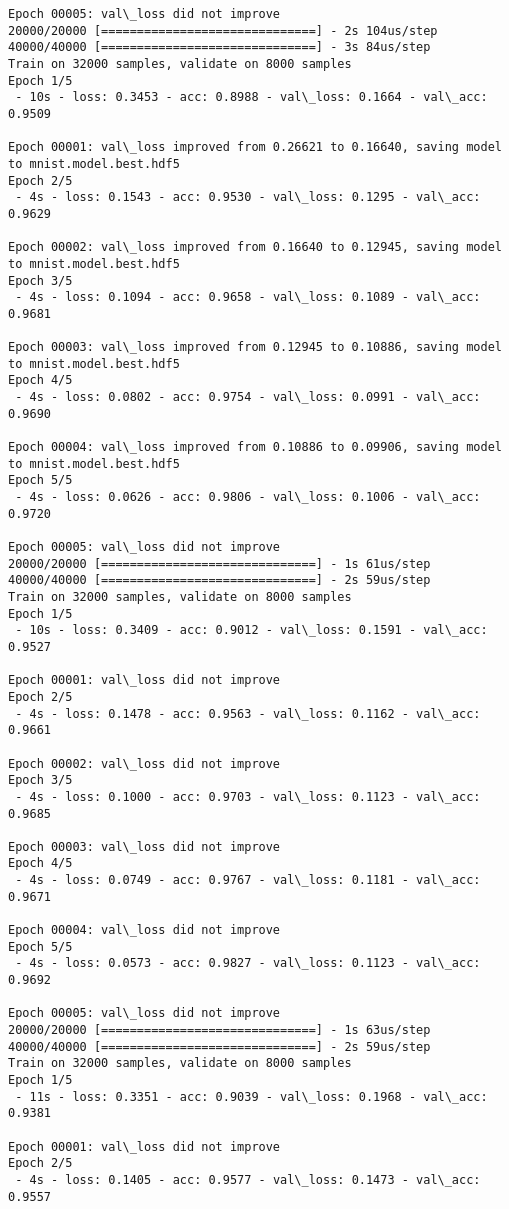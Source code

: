 \documentclass[11pt]{article}
\begin{document}
\begin{Verbatim}[commandchars=\\\{\}]
Epoch 00005: val\_loss did not improve
20000/20000 [==============================] - 2s 104us/step
40000/40000 [==============================] - 3s 84us/step
Train on 32000 samples, validate on 8000 samples
Epoch 1/5
 - 10s - loss: 0.3453 - acc: 0.8988 - val\_loss: 0.1664 - val\_acc: 0.9509

Epoch 00001: val\_loss improved from 0.26621 to 0.16640, saving model to mnist.model.best.hdf5
Epoch 2/5
 - 4s - loss: 0.1543 - acc: 0.9530 - val\_loss: 0.1295 - val\_acc: 0.9629

Epoch 00002: val\_loss improved from 0.16640 to 0.12945, saving model to mnist.model.best.hdf5
Epoch 3/5
 - 4s - loss: 0.1094 - acc: 0.9658 - val\_loss: 0.1089 - val\_acc: 0.9681

Epoch 00003: val\_loss improved from 0.12945 to 0.10886, saving model to mnist.model.best.hdf5
Epoch 4/5
 - 4s - loss: 0.0802 - acc: 0.9754 - val\_loss: 0.0991 - val\_acc: 0.9690

Epoch 00004: val\_loss improved from 0.10886 to 0.09906, saving model to mnist.model.best.hdf5
Epoch 5/5
 - 4s - loss: 0.0626 - acc: 0.9806 - val\_loss: 0.1006 - val\_acc: 0.9720

Epoch 00005: val\_loss did not improve
20000/20000 [==============================] - 1s 61us/step
40000/40000 [==============================] - 2s 59us/step
Train on 32000 samples, validate on 8000 samples
Epoch 1/5
 - 10s - loss: 0.3409 - acc: 0.9012 - val\_loss: 0.1591 - val\_acc: 0.9527

Epoch 00001: val\_loss did not improve
Epoch 2/5
 - 4s - loss: 0.1478 - acc: 0.9563 - val\_loss: 0.1162 - val\_acc: 0.9661

Epoch 00002: val\_loss did not improve
Epoch 3/5
 - 4s - loss: 0.1000 - acc: 0.9703 - val\_loss: 0.1123 - val\_acc: 0.9685

Epoch 00003: val\_loss did not improve
Epoch 4/5
 - 4s - loss: 0.0749 - acc: 0.9767 - val\_loss: 0.1181 - val\_acc: 0.9671

Epoch 00004: val\_loss did not improve
Epoch 5/5
 - 4s - loss: 0.0573 - acc: 0.9827 - val\_loss: 0.1123 - val\_acc: 0.9692

Epoch 00005: val\_loss did not improve
20000/20000 [==============================] - 1s 63us/step
40000/40000 [==============================] - 2s 59us/step
Train on 32000 samples, validate on 8000 samples
Epoch 1/5
 - 11s - loss: 0.3351 - acc: 0.9039 - val\_loss: 0.1968 - val\_acc: 0.9381

Epoch 00001: val\_loss did not improve
Epoch 2/5
 - 4s - loss: 0.1405 - acc: 0.9577 - val\_loss: 0.1473 - val\_acc: 0.9557


\end{Verbatim}
\end{document}
